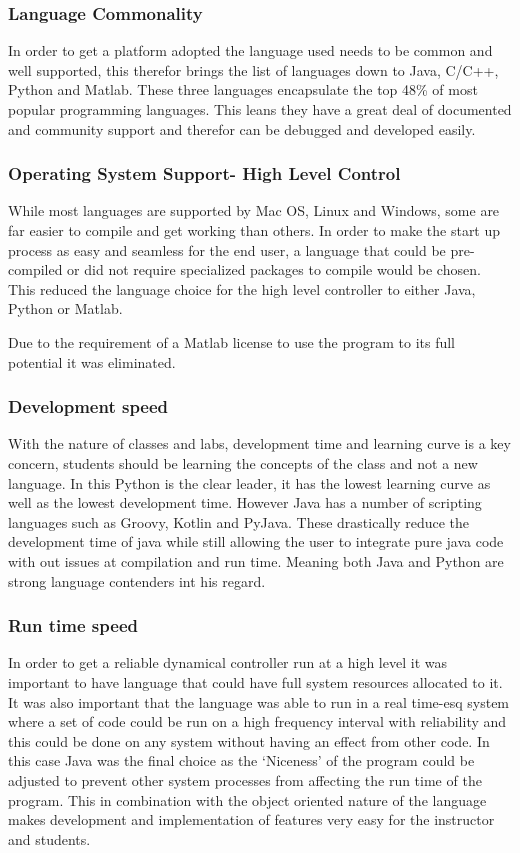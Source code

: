 \documentclass[12pt]{report}
\begin{document}
\subsubsection{Language Commonality}
    In order to get a platform adopted the language used needs to be common and well supported, this therefor brings the list of languages down to Java, C/C++, Python and Matlab. These three languages encapsulate the top 48\% of most popular programming languages\cite{tiobe}. This leans they have a great deal of documented and community support and therefor can be debugged and developed easily.

\subsubsection{Operating System Support- High Level Control}
    While most languages are supported by Mac OS, Linux and Windows, some are far easier to compile and get working than others. In order to make the start up process as easy and seamless for the end user, a language that could be pre-compiled or did not require specialized packages to compile would be chosen. This reduced the language choice for the high level controller to either Java, Python or Matlab.
    
    Due to the requirement of a Matlab license to use the program to its full potential it was eliminated. 
\subsubsection{Development speed}
    With the nature of classes and labs, development time and learning curve is a key concern, students should be learning the concepts of the class and not a new language. In this Python is the clear leader, it has the lowest learning curve as well as the lowest development time. However Java has a number of scripting languages such as Groovy, Kotlin and PyJava. These drastically reduce the development time of java while still allowing the user to integrate pure java code with out issues at compilation and run time. Meaning both Java and Python are strong language contenders int his regard.

\subsubsection{Run time speed}
    In order to get a reliable dynamical controller run at a high level it was important to have language that could have full system resources allocated to it. It was also important that the language was able to run in a real time-esq system where a set of code could be run on a high frequency interval with reliability and this could be done on any system without having an effect from other code. In this case Java was the final choice as the `Niceness' of the program could be adjusted to prevent other system processes from affecting the run time of the program. This in combination with the object oriented nature of the language makes development and implementation of features very easy for the instructor and students.\newline
\end{document}
